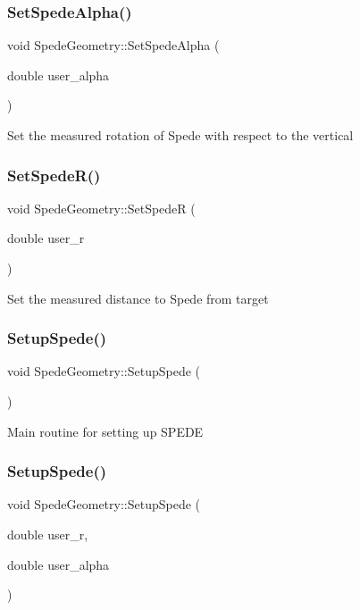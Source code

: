 \subsubsection{\texorpdfstring{Set\+Spede\+Alpha()}{SetSpedeAlpha()}}
{\footnotesize\ttfamily void Spede\+Geometry\+::\+Set\+Spede\+Alpha (\begin{DoxyParamCaption}\item[{double}]{user\+\_\+alpha }\end{DoxyParamCaption})}

Set the measured rotation of Spede with respect to the vertical \mbox{\label{class_spede_geometry_ad17f4485ee83860a40082d8c8af5237c}} 
\subsubsection{\texorpdfstring{Set\+Spede\+R()}{SetSpedeR()}}
{\footnotesize\ttfamily void Spede\+Geometry\+::\+Set\+SpedeR (\begin{DoxyParamCaption}\item[{double}]{user\+\_\+r }\end{DoxyParamCaption})}

Set the measured distance to Spede from target \mbox{\label{class_spede_geometry_aff2cf68512c9a78eb117ff1ea44e95f0}} 
\subsubsection{\texorpdfstring{Setup\+Spede()}{SetupSpede()}\hspace{0.1cm}{\footnotesize\ttfamily [1/2]}}
{\footnotesize\ttfamily void Spede\+Geometry\+::\+Setup\+Spede (\begin{DoxyParamCaption}{ }\end{DoxyParamCaption})}

Main routine for setting up S\+P\+E\+DE \mbox{\label{class_spede_geometry_ae79185d5c0e1d21a1a26ef824038ce9c}} 
\subsubsection{\texorpdfstring{Setup\+Spede()}{SetupSpede()}\hspace{0.1cm}{\footnotesize\ttfamily [2/2]}}
{\footnotesize\ttfamily void Spede\+Geometry\+::\+Setup\+Spede (\begin{DoxyParamCaption}\item[{double}]{user\+\_\+r,  }\item[{double}]{user\+\_\+alpha }\end{DoxyParamCaption})}

